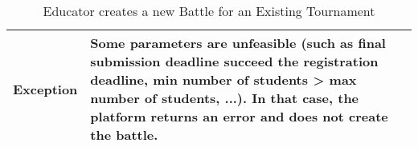 \begin{enumerate}[label=\textbf{UC\arabic*}:,ref=UC\arabic*,leftmargin=1.3cm]
{\begin{table}[H]
\begin{tabular}{|l|p{11.9cm}|}
                        \textbf{Exception}       & Some parameters are unfeasible (such as final submission deadline succeed the registration deadline, min number of students > max number of students, ...).
                        In that case, the platform returns an error and does not create the battle.                                                                                                            \\\hline
                  \end{tabular}
                  \caption{Educator creates a new Battle for an Existing Tournament        }
                  \label{table:Educator creates a new Battle for an Existing Tournament         }
            \end{table}
            \pagebreak
            \begin{adjustbox}{
                        max size={\textwidth}{},
                        caption={Educator creates a new Battle for an Existing Tournament},
                        label={fig:Educator creates a new Battle for an Existing Tournament},
                        figure=H}
                  \centering
            \end{adjustbox}
            \pagebreak
      }
\end{enumerate}
